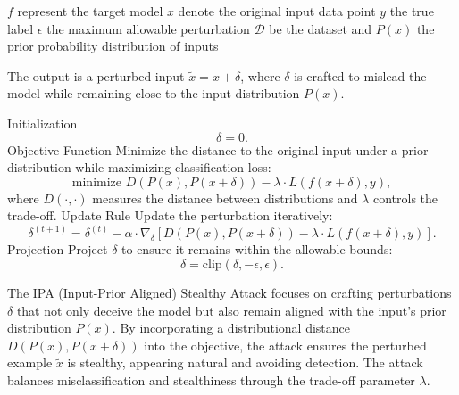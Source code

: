 \( f \) represent the target model
\( x \) denote the original input data point
\( y \) the true label 
\( \epsilon \) the maximum allowable perturbation
\( \mathcal{D} \) be the dataset and \( P(x) \) the prior probability distribution of inputs

The output is a perturbed input \( \tilde{x} = x + \delta \), where \( \delta \) is crafted to mislead the model while remaining close to the input distribution \( P(x) \).

Initialization
   \[
   \delta = 0.
   \]
Objective Function
   Minimize the distance to the original input under a prior distribution while maximizing classification loss:
   \[
   \text{minimize } D(P(x), P(x + \delta)) - \lambda \cdot L(f(x + \delta), y),
   \]
   where \( D(\cdot, \cdot) \) measures the distance between distributions and \( \lambda \) controls the trade-off.
Update Rule
   Update the perturbation iteratively:
   \[
   \delta^{(t+1)} = \delta^{(t)} - \alpha \cdot \nabla_{\delta} \left[ D(P(x), P(x + \delta)) - \lambda \cdot L(f(x + \delta), y) \right].
   \]
Projection
   Project \( \delta \) to ensure it remains within the allowable bounds:
   \[
   \delta = \text{clip}(\delta, -\epsilon, \epsilon).
   \]

The IPA (Input-Prior Aligned) Stealthy Attack focuses on crafting perturbations \( \delta \) that not only deceive the model but also remain aligned with the input's prior distribution \( P(x) \). By incorporating a distributional distance \( D(P(x), P(x + \delta)) \) into the objective, the attack ensures the perturbed example \( \tilde{x} \) is stealthy, appearing natural and avoiding detection. The attack balances misclassification and stealthiness through the trade-off parameter \( \lambda \).